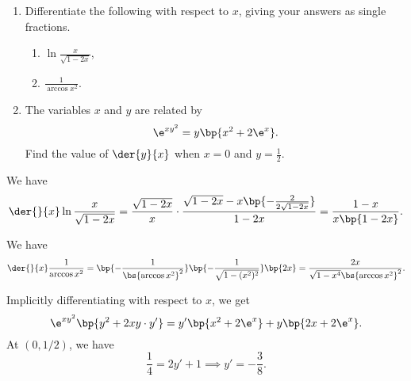 \begin{problem}
    \begin{enumerate}
        \item Differentiate the following with respect to $x$, giving your answers as single fractions.
        \begin{enumerate}
            \item $\ln \frac{x}{\sqrt{1 - 2x}}$,
            \item $\frac1{\arccos{x^2}}$.
        \end{enumerate}
        \item The variables $x$ and $y$ are related by \[\e^{xy^2} = y \bp{x^2 + 2\e^x}.\] Find the value of $\der{y}{x}$ when $x = 0$ and $y = \frac12$.
    \end{enumerate}
\end{problem}
\begin{solution}
    \begin{ppart}
        \begin{psubpart}
            We have \[\der{}{x} \ln \frac{x}{\sqrt{1 - 2x}} = \frac{\sqrt{1-2x}}{x} \cdot \frac{\sqrt{1-2x} - x\bp{-\frac{2}{2\sqrt{1-2x}}}}{1 - 2x} = \frac{1-x}{x\bp{1 - 2x}}.\]
        \end{psubpart}
        \begin{psubpart}
            We have \[\der{}{x} \frac1{\arccos{x^2}} = \bp{-\frac{1}{\bs{\arccos{x^2}}^2}} \bp{-\frac1{\sqrt{1 - (x^2)^2}}}\bp{2x} = \frac{2x}{\sqrt{1 - x^4} \bs{\arccos{x^2}}^2}.\]
        \end{psubpart}
    \end{ppart}
    \begin{ppart}
        Implicitly differentiating with respect to $x$, we get \[\e^{xy^2} \bp{y^2 + 2xy\cdot y'} = y' \bp{x^2 + 2\e^x} + y\bp{2x + 2\e^x}.\] At $(0, 1/2)$, we have \[\frac14 = 2y' + 1 \implies y' = -\frac38.\]
    \end{ppart}
\end{solution}